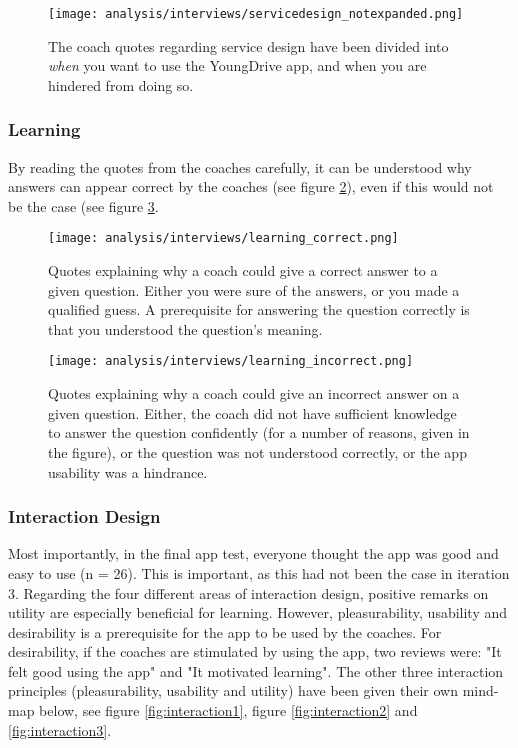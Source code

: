 \begin{figure}[h]
    \centering
    \texttt{[image: analysis/interviews/servicedesign\_notexpanded.png]}
    \caption{The coach quotes regarding service design have been divided into \textit{when} you want to use the YoungDrive app, and when you are hindered from doing so.}
    \label{fig:servicedesign}
\end{figure}

\clearpage

\subsubsection{Learning}\label{sec:interview-learning}

By reading the quotes from the coaches carefully, it can be understood why answers can appear correct by the coaches (see figure \ref{fig:learning1}), even if this would not be the case (see figure \ref{fig:learning2}.

\begin{figure}[h]
    \centering
    \texttt{[image: analysis/interviews/learning\_correct.png]}
    \caption{Quotes explaining why a coach could give a correct answer to a given question. Either you were sure of the answers, or you made a qualified guess. A prerequisite for answering the question correctly is that you understood the question's meaning.}
    \label{fig:learning1}
\end{figure}

\begin{figure}[h]
    \centering
    \texttt{[image: analysis/interviews/learning\_incorrect.png]}
    \caption{Quotes explaining why a coach could give an incorrect answer on a given question. Either, the coach did not have sufficient knowledge to answer the question confidently (for a number of reasons, given in the figure), or the question was not understood correctly, or the app usability was a hindrance.}
    \label{fig:learning2}
\end{figure}

\clearpage

\subsubsection{Interaction Design}

Most importantly, in the final app test, everyone thought the app was good and easy to use (n = 26). This is important, as this had not been the case in iteration 3. Regarding the four different areas of interaction design, positive remarks on utility are especially beneficial for learning. However, pleasurability, usability and desirability is a prerequisite for the app to be used by the coaches. For desirability, if the coaches are stimulated by using the app, two reviews were: "It felt good using the app" and "It motivated learning". The other three interaction principles (pleasurability, usability and utility) have been given their own mind-map below, see figure \ref{fig:interaction1}, figure \ref{fig:interaction2} and \ref{fig:interaction3}.

